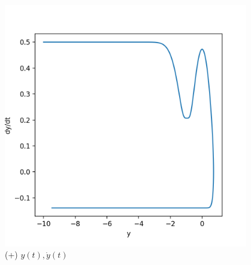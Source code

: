 \documentclass[a4paper,12pt]{article}
\begin{document}
\begin{figure}[H]
\begin{minipage}{0.5\textwidth}
		\includegraphics[width=0.95\textwidth]{./phase-og-2.png}
		\caption{ (+) $y(t), \dot{y}(t)$ }
	\end{minipage}
\end{figure}
\end{document}

